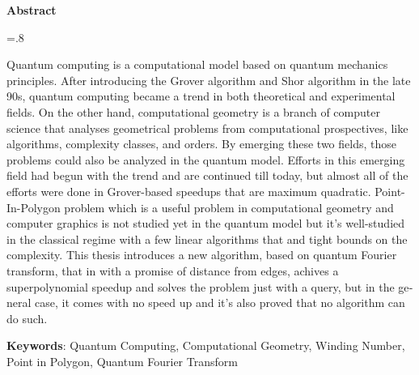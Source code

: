 


\pagestyle{empty}

\begin{latin}

\begin{center}
\textbf{Abstract}
\end{center}
\baselineskip=.8\baselineskip

Quantum computing is a computational model based on quantum mechanics principles. After introducing the Grover algorithm and Shor algorithm in the late 90s, quantum computing became a trend in both theoretical and experimental fields. On the other hand, computational geometry is a branch of computer science that analyses geometrical problems from computational prospectives, like algorithms, complexity classes, and orders. By emerging these two fields, those problems could also be analyzed in the quantum model. Efforts in this emerging field had begun with the trend and are continued till today, but almost all of the efforts were done in Grover-based speedups that are maximum quadratic. Point-In-Polygon problem which is a useful problem in computational geometry and computer graphics is not studied yet in the quantum model but it's well-studied in the classical regime with a few linear algorithms that and tight bounds on the complexity. This thesis introduces a new algorithm, based on quantum Fourier transform, that in with a promise of distance from edges, achives a superpolynomial speedup and solves the problem just with a query, but in the general case, it comes with no speed up and it's also proved that no algorithm can do such.

\bigskip\noindent\textbf{Keywords}:
Quantum Computing, Computational Geometry, Winding Number, Point in Polygon, Quantum Fourier Transform

\end{latin}

\newpage
